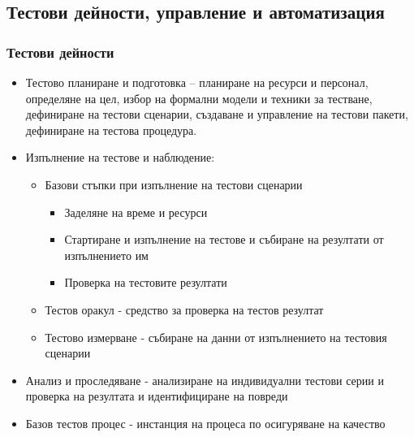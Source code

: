 \documentclass[fleqn,12pt]{article}
\begin{document}
\begin{flushleft}
\subsection{Тестови дейности, управление и автоматизация}
  \subsubsection{Тестови дейности}
    \begin{itemize}
        \item Тестово планиране и подготовка -- планиране на ресурси и персонал, определяне на цел, избор на формални модели и техники за тестване,\\
        дефиниране на тестови сценарии, създаване и управление на тестови пакети, дефиниране на тестова процедура.
        \item Изпълнение на тестове и наблюдение:
            \begin{itemize}
                \item Базови стъпки при изпълнение на тестови сценарии
                    \begin{itemize}
                        \item Заделяне на време и ресурси
                        \item Стартиране и изпълнение на тестове и събиране на резултати от изпълнението им
                        \item Проверка на тестовите резултати
                    \end{itemize}
                \item Тестов оракул - средство за проверка на тестов резултат
                \item Тестово измерване - събиране на данни от изпълнението на тестовия сценарии
            \end{itemize}
        \item Анализ и проследяване - анализиране на индивидуални тестови серии и проверка на резултата и идентифициране на повреди
        \item Базов тестов процес - инстанция на процеса по осигуряване на качество
    \end{itemize}

\end{flushleft}
\end{document}
